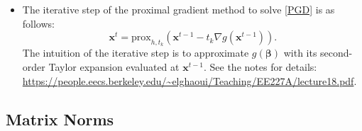 \begin{itemize}
            
        \item The iterative step of the proximal gradient method to solve \eqref{PGD} is as follows:
            \begin{equation}
                    \bm{x}^t = \text{prox}_{h, t_k}\left( \bm{x}^{t-1} - t_k \nabla g(\bm{x}^{t-1}) \right).
            \end{equation}
        The intuition of the iterative step is to approximate $g(\bm{\beta})$ with its second-order Taylor expansion evaluated at $\bm{x}^{t-1}$.
        See the notes for details: \url{https://people.eecs.berkeley.edu/~elghaoui/Teaching/EE227A/lecture18.pdf}.
    \end{itemize}
    
\subsection{Matrix Norms}
